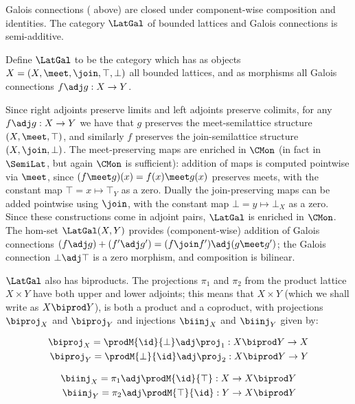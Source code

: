 Galois connections ( above) are closed under component-wise composition and
identities. The category $\LatGal$ of bounded lattices and Galois connections is semi-additive.

\begin{definition}
Define $\LatGal$ to be the category which has as objects $X = (X, \meet, \join, \top, \bot)$ all bounded
lattices, and as morphisms all Galois connections $f \adj g: X \to Y$.
\end{definition}

\noindent Since right adjoints preserve limits and left adjoints preserve colimits, for any $f \adj g: X \to
Y$ we have that $g$ preserves the meet-semilattice structure $(X, \meet, \top)$, and similarly $f$ preserves
the join-semilattice structure $(X, \join, \bot)$. The meet-preserving maps are enriched in $\CMon$ (in fact
in $\SemiLat$, but again $\CMon$ is sufficient): addition of maps is computed pointwise via $\meet$, since $(f
\meet g)(x) = f(x) \meet g(x)$ preserves meets, with the constant map $\top = x \mapsto \top_Y$ as a zero.
Dually the join-preserving maps can be added pointwise using $\join$, with the constant map $\bot = y \mapsto
\bot_X$ as a zero. Since these constructions come in adjoint pairs, $\LatGal$ is enriched in $\CMon$. The
hom-set $\LatGal(X,Y)$ provides (component-wise) addition of Galois connections $(f \adj g) + (f' \adj g') =
(f \join f') \adj (g \meet g')$; the Galois connection $\bot \adj \top$ is a zero morphism, and composition is
bilinear.

$\LatGal$ also has biproducts. The projections $\pi_1$ and $\pi_2$ from the product lattice $X \times Y$ have
both upper and lower adjoints; this means that $X \times Y$ (which we shall write as $X \biprod Y$), is both a
product and a coproduct, with projections $\biproj_X$ and $\biproj_Y$ and injections $\biinj_X$ and $\biinj_Y$
given by:

\vspace{-4mm}
\begin{minipage}[t]{0.45\textwidth}
\begin{center}
\begin{align*}
   \biproj_X = \prodM{\id}{\bot} \adj \proj_1: X \biprod Y \to X \\
   \biproj_Y = \prodM{\bot}{\id} \adj \proj_2: X \biprod Y \to Y
\end{align*}
\end{center}
\end{minipage}%
\begin{minipage}[t]{0.45\textwidth}
\begin{center}
\begin{align*}
   \biinj_X = \pi_1 \adj \prodM{\id}{\top} : X \to X \biprod Y \\
   \biinj_Y = \pi_2 \adj \prodM{\top}{\id}: Y \to X \biprod Y
\end{align*}
\end{center}
\end{minipage}
\vspace{2mm}

